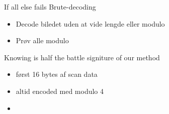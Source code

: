 \begin{frame}{If all else fails}
	Brute-decoding
		\begin{itemize}
		\item Decode biledet uden at vide lengde eller modulo
		\item Prøv alle modulo
		\end{itemize}
\end{frame}

\begin{frame}{Knowing is half the battle}
	signiture of our method
		\begin{itemize}
		\item først 16 bytes af scan data
		\item altid encoded med modulo 4
		\item 
		\end{itemize}
\end{frame}